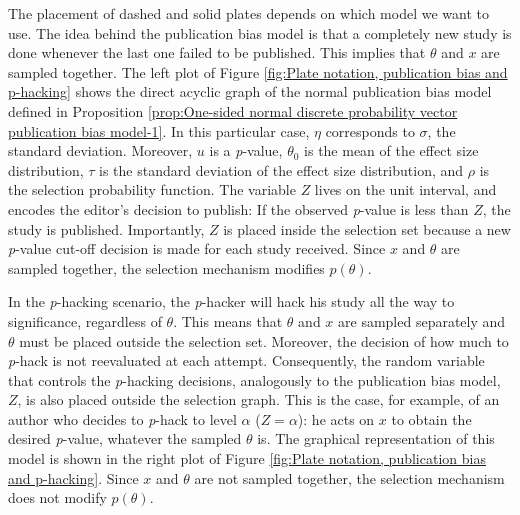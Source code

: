 \documentclass[useAMS,usenatbib,referee]{biom}
\begin{document}
The placement of dashed and solid plates depends on which model we want to use. The idea behind the publication bias model is that a completely new study is done whenever the last one failed to be published. This implies that $\theta$ and $x$ are sampled together. The left plot of Figure \ref{fig:Plate notation, publication bias and p-hacking} shows the direct acyclic graph of the normal publication bias model defined in Proposition \ref{prop:One-sided normal discrete probability vector publication bias model-1}. In this particular case, $\eta$ corresponds to $\sigma$, the standard deviation. Moreover, $u$ is a \textit{p}-value, $\theta_{0}$ is the mean of the effect size distribution, $\tau$ is the standard deviation of the effect size distribution, and $\rho$ is the selection probability function. The variable $Z$ lives on the unit interval, and encodes the editor's decision to publish: If the observed \textit{p}-value is less than $Z$, the study is published. Importantly, $Z$ is placed inside the selection set because a new \textit{p}-value cut-off decision is made for each study received. Since $x$ and $\theta$ are sampled together, the selection mechanism modifies $p(\theta)$.%

In the \textit{p}-hacking scenario, the \textit{p}-hacker will hack his study all the way to significance, regardless of $\theta$. This means that $\theta$ and $x$ are sampled separately and $\theta$ must be placed outside the selection set. Moreover, the decision of how much to \textit{p}-hack is not reevaluated at each attempt. Consequently, the random variable that controls the \textit{p}-hacking decisions, analogously to the publication bias model, $Z$, is also placed outside the selection graph. This is the case, for example, of an author who decides to \textit{p}-hack to level $\alpha$ ($Z = \alpha$): he acts on $x$ to obtain the desired \textit{p}-value, whatever the sampled $\theta$ is. The graphical representation of this model is shown in the right plot of Figure \ref{fig:Plate notation, publication bias and p-hacking}. Since $x$ and $\theta$ are not sampled together, the selection mechanism does not modify $p(\theta)$.
\end{document}
